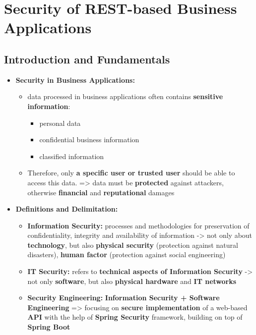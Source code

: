 \documentclass[ieeetran]{article}
\begin{document}
\section{Security of REST-based Business Applications} %
\label{sec:security_of_rEST_based_business_applications}

\subsection{Introduction and Fundamentals} %
\label{sub:introduction_and_fundamentals}
\begin{itemize}
  \item \textbf{Security in Business Applications:}
	  \begin{itemize}
	    \item data processed in business applications often contains \textbf{sensitive information}:
		    \begin{itemize}
		      \item personal data
		\item confidential business information
			\item classified information
		    \end{itemize}
		 \item Therefore, only \textbf{a specific user or trusted user} should be able to access this data. => data must be \textbf{protected} against attackers, otherwise \textbf{financial} and \textbf{reputational} damages
	  \end{itemize}

\item \textbf{Definitions and Delimitation:}
	\begin{itemize}
	  \item \textbf{Information Security:} processes and methodologies for preservation of confidentiality, integrity and availability of information -> not only about \textbf{technology}, but also \textbf{physical security} (protection against natural disasters), \textbf{human factor} (protection against social engineering)

	\item \textbf{IT Security:} refers to \textbf{technical aspects of Information Security} -> not only \textbf{software}, but also \textbf{physical hardware} and \textbf{IT networks} 

	\item \textbf{Security Engineering:} \textbf{Information Security + Software Engineering} => focusing on \textbf{secure implementation} of a web-based \textbf{API} with the help of \textbf{Spring Security} framework, building on top of \textbf{Spring Boot}
	\end{itemize}


\end{itemize}
\end{document}
